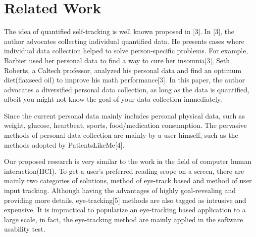 \documentclass{sigchi}
\begin{document}
\section{Related Work}

The idea of quantified self-tracking is well known proposed in [3]. In [3], the author advocates collecting individual quantified data. He presents cases where individual data collection helped to solve person-specific problems. For example, Barbier used her personal data to find a way to cure her insomnia[3],  Seth Roberts, a Caltech professor, analyzed his personal data and find an optimum diet(flaxseed oil) to improve his math performance[3]. In this paper, the author advocates a diversified personal data collection, as long as the data is quantified, albeit you might not know the goal of your data collection immediately. 


Since the current personal data mainly includes personal physical data, such as weight, glucose, heartbeat, sports, food/medication consumption. The pervasive methods of personal data collection are mainly by a user himself, such as the methods adopted by PatientsLikeMe[4]. 


	Our proposed research is very similar to the work in the field of computer human interaction(HCI). To get a user’s preferred reading scope on a screen, there are mainly two categories of solutions, method of eye-track based and method of user input tracking.  
Although having the advantages of highly goal-revealing and providing more details, eye-tracking[5] methods are also tagged as intrusive and expensive. It is impractical to popularize an eye-tracking based application to a large scale, in fact, the eye-tracking method are mainly applied in the software usability test. 
\end{document}
